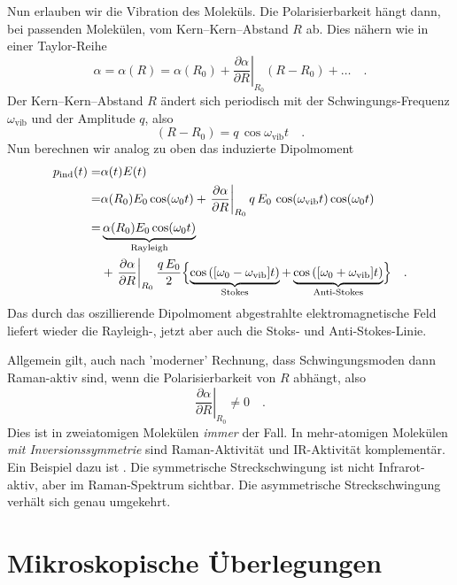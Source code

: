 Nun erlauben wir die Vibration des Moleküls. Die Polarisierbarkeit hängt dann, bei passenden Molekülen, vom Kern--Kern--Abstand $R$ ab. Dies nähern wie in einer Taylor-Reihe
\begin{equation}
\alpha = \alpha(R) = \alpha(R_0) + \left. \frac{\partial \alpha}{\partial R} \right|_{R_0}  \left( R - R_0 \right) + \dots \quad .
\end{equation}
Der Kern--Kern--Abstand $R$ ändert sich periodisch mit der Schwingungs-Frequenz $\omega_\text{vib}$ und der Amplitude $q$, also
\begin{equation}
\left( R - R_0 \right) = q \, \cos \omega_\text{vib} t \quad .
\end{equation}
Nun berechnen wir analog zu oben das induzierte Dipolmoment
\begin{align}
p_\text{ind}(t) = & \alpha(t) E(t) \\
= & \alpha(R_0) E_0 \cos(\omega_0 t) +
\left. \frac{\partial \alpha}{\partial R} \right|_{R_0}   q \,  E_0 \, \cos (\omega_\text{vib} t)  \cos(\omega_0 t) \\
= & \underbrace{  \alpha(R_0) E_0 \cos(\omega_0 t) }_\text{Rayleigh} \\
& + \left. \frac{\partial \alpha}{\partial R} \right|_{R_0}  \frac{ q \,  E_0 }{2} 
\Bigl\{ 
\underbrace{ \cos \left( [\omega_0 -\omega_\text{vib}] t \right)}_\text{Stokes}  +  \underbrace{\cos \left( [\omega_0 + \omega_\text{vib}] t \right)  
}_\text{Anti-Stokes} 
\Bigr\}  \quad .
\nonumber
\end{align}
Das durch das oszillierende Dipolmoment abgestrahlte elektromagnetische Feld liefert wieder die Rayleigh-, jetzt aber auch die Stoks- und Anti-Stokes-Linie.

Allgemein gilt, auch nach 'moderner' Rechnung, dass Schwingungsmoden dann Raman-aktiv sind, wenn die  Polarisierbarkeit von $R$ abhängt, also 
\begin{equation}
\left. \frac{\partial \alpha}{\partial R} \right|_{R_0} \neq 0 \quad .
\end{equation}
Dies ist in zweiatomigen Molekülen \emph{immer} der Fall. In mehr-atomigen Molekülen \emph{mit Inversionssymmetrie} sind Raman-Aktivität und IR-Aktivität komplementär. Ein Beispiel dazu ist . Die symmetrische Streckschwingung ist nicht Infrarot-aktiv, aber im Raman-Spektrum sichtbar. Die asymmetrische Streckschwingung verhält sich genau umgekehrt.


\section{Mikroskopische Überlegungen}

